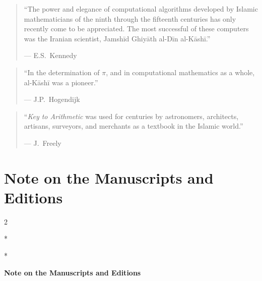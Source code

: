 \documentclass[11pt,a4paper]{article}
\newcommand{\ar}[1]{{\arabicfont\beginR #1\endR}}
\newenvironment{bilingual}{%
  \vspace{0.3em}%
  \begin{paracol}{2}%
}{%
  \end{paracol}%
  \vspace{0.3em}%
}
\begin{document}
\vspace{0.3cm}

\begin{quote}
``The power and elegance of computational algorithms developed by
Islamic mathematicians of the ninth through the fifteenth centuries
has only recently come to be appreciated. The most successful of
these computers was the Iranian scientist, Jamsh\=id Ghiy\=ath al-D\=in
al-K\=ash\=i.''
\begin{flushright}
--- E.S.\ Kennedy
\end{flushright}
\end{quote}

\vspace{0.3cm}

\begin{quote}
``In the determination of $\pi$, and in computational mathematics
as a whole, al-K\=ash\=i was a pioneer.''
\begin{flushright}
--- J.P.\ Hogendijk
\end{flushright}
\end{quote}

\vspace{0.3cm}

\begin{quote}
``\textit{Key to Arithmetic} was used for centuries by astronomers,
architects, artisans, surveyors, and merchants as a textbook in the
Islamic world.''
\begin{flushright}
--- J.\ Freely
\end{flushright}
\end{quote}
\clearpage

\section{Note on the Manuscripts and Editions}
\label{app:manuscripts}

\begin{bilingual}
\switchcolumn[0]*
\begin{center}
\textbf{\Large\color{chapcolor}\ar{ملاحظة على المخطوطات والطبعات}}
\end{center}
\switchcolumn[1]*
\begin{center}
\textbf{\Large\color{chapcolor}Note on the Manuscripts and Editions}
\end{center}
\end{bilingual}
\end{document}
